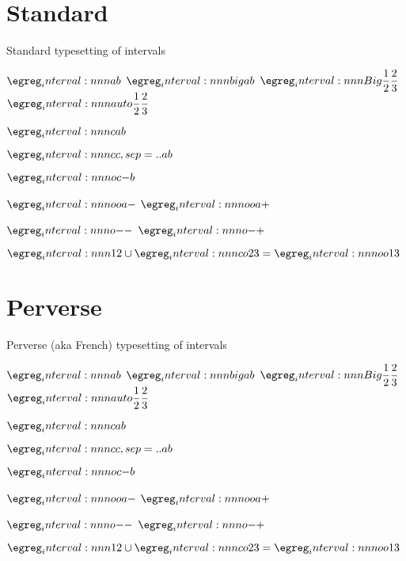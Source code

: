 \documentclass[varwidth, border = 3pt]{standalone}
\begin{document}
\section*{Standard}
Standard typesetting of intervals

$\interval{a,b}$\quad
$\interval[big]{a,b}$\quad
$\interval[Big]{\dfrac{1}{2},\dfrac{2}{3}}$\quad
$\interval[auto]{\dfrac{1}{2},\dfrac{2}{3}}$

$\interval[c]{a,b}$

$\interval[cc,sep=..]{a,b}$

$\interval[oc]{-,b}$

$\interval[oo]{a,-}$\qquad
$\interval[oo]{a,+}$

$\interval[o]{-,-}$\qquad
$\interval[o]{-,+}$

$\interval{1,2}\cup\interval[co]{2,3}=\interval[oo]{1,3}$

\section*{Perverse}
Perverse (aka French) typesetting of intervals


$\interval{a,b}$\quad
$\interval[big]{a,b}$\quad
$\interval[Big]{\dfrac{1}{2},\dfrac{2}{3}}$\quad
$\interval[auto]{\dfrac{1}{2},\dfrac{2}{3}}$

$\interval[c]{a,b}$

$\interval[cc,sep=..]{a,b}$

$\interval[oc]{-,b}$

$\interval[oo]{a,-}$\qquad
$\interval[oo]{a,+}$

$\interval[o]{-,-}$\qquad
$\interval[o]{-,+}$

$\interval{1,2}\cup\interval[co]{2,3}=\interval[oo]{1,3}$
\end{document}
